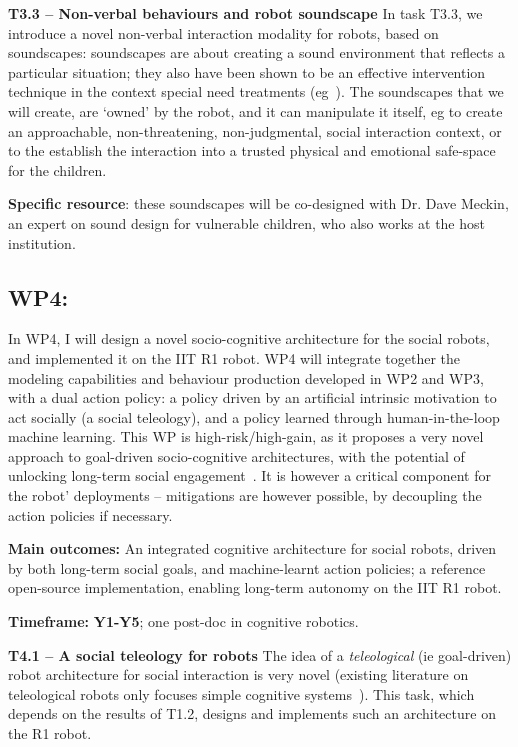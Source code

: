 \documentclass[11pt,a4paper]{report}
\begin{document}
\textbf{T3.3 -- Non-verbal behaviours and robot soundscape} In task T3.3, we
introduce a novel non-verbal interaction modality for robots, based on
soundscapes: soundscapes are about creating a sound environment that reflects a
particular situation; they also have been shown to be an effective intervention
technique in the context special need treatments
(eg~\cite{greher2010soundscape}). The soundscapes that we will create, are
`owned' by the robot, and it can manipulate it itself, eg to create an
approachable, non-threatening, non-judgmental, social interaction context, or to
the establish the interaction into a trusted physical and emotional safe-space
for the children.

\textbf{Specific resource}: these soundscapes will be co-designed with Dr.
Dave Meckin, an expert on sound design for vulnerable children, who also works
at the host institution.

\subsection{WP4: \textbf{\wpFour}}

In WP4, I will design a novel socio-cognitive architecture for the
social robots, and implemented it on the IIT R1 robot.
WP4 will integrate together the modeling capabilities and behaviour production
developed in WP2 and WP3, with a dual action policy: a policy driven by an
artificial intrinsic motivation to act socially (a social teleology), and a
policy learned through human-in-the-loop machine learning. This WP is
high-risk/high-gain, as it proposes a very novel approach to goal-driven
socio-cognitive architectures, with the potential of unlocking long-term social
engagement~\cite{hoffman2019anki}. It is however a critical component for the
robot' deployments -- mitigations are however possible, by decoupling the action
policies if necessary.

\begin{framed}
    \textbf{Main outcomes:} An integrated cognitive architecture for social
    robots, driven by both long-term social goals, and machine-learnt action
    policies; a reference open-source implementation, enabling long-term
    autonomy on the IIT R1 robot.

    \textbf{Timeframe:} \textbf{Y1-Y5}; one post-doc in cognitive robotics.

\end{framed}

\textbf{T4.1 -- A social teleology for robots}
The idea of a \emph{teleological} (ie goal-driven) robot architecture for social
interaction is very novel (existing literature on teleological robots only focuses
simple cognitive systems~\cite{oudeyer2005playground,forestier2017unified}). This task,
which depends on the results of T1.2, designs and implements such an
architecture on the R1 robot.
\end{document}
